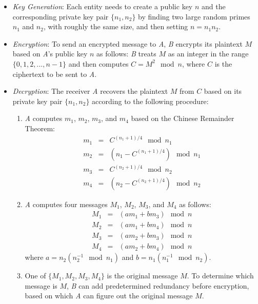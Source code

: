 \documentclass[letterpaper,12pt]{article}
\begin{document}
\begin{itemize}
\item \emph{Key Generation}: Each entity needs to create a public key $n$ and the corresponding private key pair $\{n_1, n_2\}$  by finding two large random primes $n_1$ and $n_2$, with roughly the same size, and then setting $n=n_1n_2$. %

\item \emph{Encryption}: To send an encrypted message to \emph{A}, \emph{B} encrypts its plaintext $M$ based on \emph{A}'s public key $n$ as follows: \emph{B} treats $M$ as an integer in the range $\{0, 1, 2,..., n-1\}$ and then computes $C=M^2 \mod n$, where $C$ is the ciphertext to be sent to \emph{A}.

\item \emph{Decryption}: The receiver \emph{A} recovers the plaintext $M$ from $C$ based on its private key pair $\{n_1, n_2\}$ according to the following procedure:
\begin{enumerate}
\item   \emph{A} computes $m_1$, $m_2$, $m_3$, and $m_4$ based on the Chinese Remainder Theorem:
\begin{eqnarray}
m_1 & = & C^{(n_1+1)/4} \mod n_1 \nonumber \\
m_2 & = & (n_1-C^{(n_1+1)/4}) \mod n_1 \nonumber \\
m_3 & =& C^{(n_2+1)/4} \mod n_2 \nonumber \\
m_4 & = & (n_2-C^{(n_2+1)/4}) \mod n_2 \nonumber
\end{eqnarray}

\item \emph{A} computes four messages $M_1$, $M_2$, $M_3$, and $M_4$ as follows:
\begin{eqnarray}
M_1 & = & (a m_1+b m_3) \mod n  \nonumber \\
M_2 & = &(a m_1+b m_4) \mod n\nonumber \\
M_3 & = & (a m_2+b m_3) \mod n\nonumber \\
M_4 & = & (a m_2+b m_4) \mod n\nonumber
\end{eqnarray}
where $a=n_2 (n_2^{-1} \mod n_1)$ and $b=n_1 (n_1^{-1} \mod n_2)$.

\item  One of $\{M_1, M_2, M_3, M_4\}$ is the original message $M$. To determine which message is $M$, \emph{B} can add predetermined redundancy before encryption, based on which \emph{A} can figure out the original message $M$.
\end{enumerate}

\end{itemize}
\end{document}
